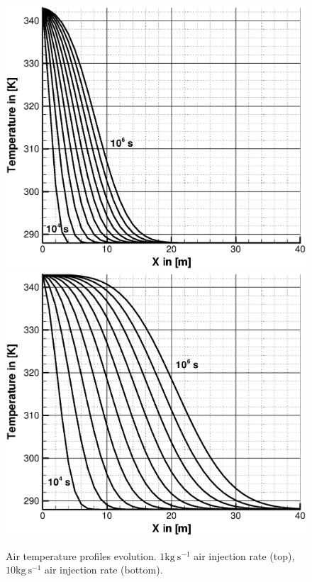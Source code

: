\begin{figure}[htb!]
\includegraphics[scale=0.3]{PART_II/G/t_1.eps}
\includegraphics[scale=0.3]{PART_II/G/t_10.eps}
\caption{Air temperature profiles evolution. $1 \mathrm {kg~s^{-1}}$ air injection rate (top), $10 \mathrm {kg~s^{-1}}$ air injection rate (bottom).}
\label{fig:air_heat_1d_heat}
\end{figure}

